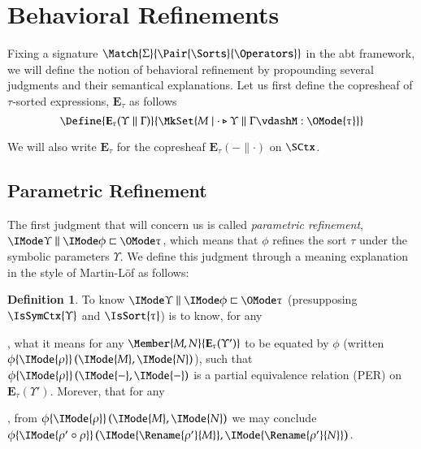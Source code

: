 \documentclass[11pt]{article}
\theoremstyle{definition}
\newtheorem{definition}[thm]{Definition}
\theoremstyle{notation}
\theoremstyle{remark}
\numberwithin{equation}{section}
\newcommand\IsAbtUnmoded[5]{
  #1\triangleright%
  #2\parallel%
  #3\vdash%
  #4:\OMode{#5}%
}
\newcommand\Exprs{\mathbf{E}}
\begin{document}
\section{Behavioral Refinements}

Fixing a signature $\Match{\Sigma}{\Pair{\Sorts}{\Operators}}$ in the abt
framework, we will define the notion of behavioral refinement by propounding
several judgments and their semantical explanations. Let us first define the
copresheaf of $\tau$-sorted expressions, $\Exprs_\tau$ as follows
\[
  \Define{
    \Exprs_\tau(\Upsilon\parallel\Gamma)
  }{
    \MkSet{M \mid \IsAbtUnmoded{\cdot}{\Upsilon}{\Gamma}{M}{\tau}}
  }
\]

We will also write $\Exprs_\tau$ for the copresheaf $\Exprs_\tau(-\parallel\cdot)$ on $\SCtx$.

\subsection{Parametric Refinement}
\label{sec:parametric-refinement}

The first judgment that will concern us is called \emph{parametric refinement},
$\Refines{\Upsilon}{\phi}{\tau}$, which means that $\phi$ refines the sort
$\tau$ under the symbolic parameters $\Upsilon$. We define this judgment
through a meaning explanation in the style of Martin-L\"of as follows:

\newcommand\RefEquate[4]{#1\{\IMode{#2}\}\left(\IMode{#3},\IMode{#4}\right)}

\begin{definition}
  To know $\Refines{\Upsilon}{\phi}{\tau}$ (presupposing $\IsSymCtx{\Upsilon}$
  and $\IsSort{\tau}$) is to know, for any
, what it means for any $\Member{M,N}{\Exprs_\tau(\Upsilon')}$ to be equated by
  $\phi$ (written $\RefEquate{\phi}{\rho}{M}{N}$), such that
  $\RefEquate{\phi}{\rho}{-}{-}$ is a partial equivalence relation (PER) on
  $\Exprs_\tau(\Upsilon')$. Morever, that for any
,
  from $\RefEquate{\phi}{\rho}{M}{N}$ we may conclude
  $\RefEquate{\phi}{\rho'\circ\rho}{\Rename{\rho'}{M}}{\Rename{\rho'}{N}}$.
\end{definition}
\end{document}
